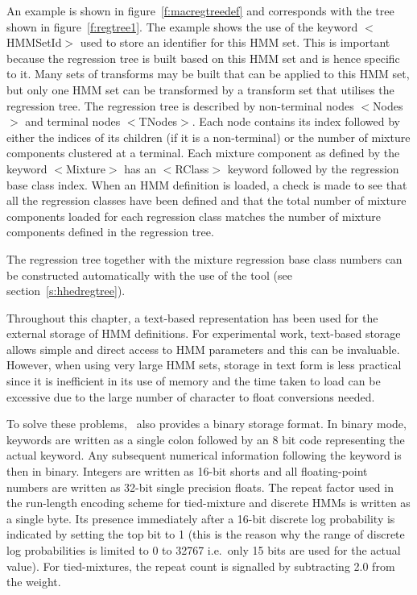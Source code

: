 An example is shown in
figure~\ref{f:macregtreedef} and corresponds with the tree shown in
figure~\ref{f:regtree1}. The example shows the use of the keyword {\sf
$<$HMMSetId$>$} used to store an identifier for this HMM set. This is
important because the regression tree is built based on this HMM set
and is hence specific to it. Many sets of transforms may be built that
can be applied to this HMM set, but only one HMM set can be
transformed by a transform set that utilises the regression tree.
The regression tree is described by non-terminal nodes {\sf $<$Nodes$>$} and
terminal nodes {\sf $<$TNodes$>$}. Each node contains its index
followed by either the indices of its children (if it is a
non-terminal) or the number of mixture components clustered at a
terminal. Each mixture component as defined by the keyword  {\sf
$<$Mixture$>$} has an {\sf $<$RClass$>$} keyword followed by the
regression base class index.
When an HMM definition is loaded, a check is made to see that all the
regression classes have been defined and that the total number of
mixture components loaded for each regression class matches the number
of mixture components defined in the regression tree.

The regression tree together with the mixture regression base class
numbers can be constructed automatically with the use of the tool
 (see section~\ref{s:hhedregtree}).



Throughout this chapter, a text-based representation
has been used for the external storage of HMM
definitions.  For experimental work, text-based storage allows
simple and direct 
access to HMM parameters and this can be invaluable.
However, when using very large HMM sets, storage in text form
is less practical since it is inefficient in its use of
memory and the time taken to load can be excessive due to
the large number of character to float conversions needed.

To solve these problems, \HTK\ also provides a 
binary storage
format.  In binary mode, keywords are written as a single
colon followed by an 8 bit code representing the actual
keyword.  Any subsequent numerical information following
the keyword is then in binary.  Integers are written as
16-bit shorts and all floating-point numbers are written
as 32-bit single precision floats.  The repeat
factor used in the run-length encoding
scheme for tied-mixture and discrete HMMs is written as
a single byte.  Its presence immediately after a 16-bit
discrete log probability is indicated by setting the top
bit to 1 (this is the reason why the range of discrete 
log probabilities is limited to
0 to 32767 i.e.\ only 15 bits are used for the actual
value).  For tied-mixtures, the repeat count is signalled
by subtracting 2.0 from the weight.

